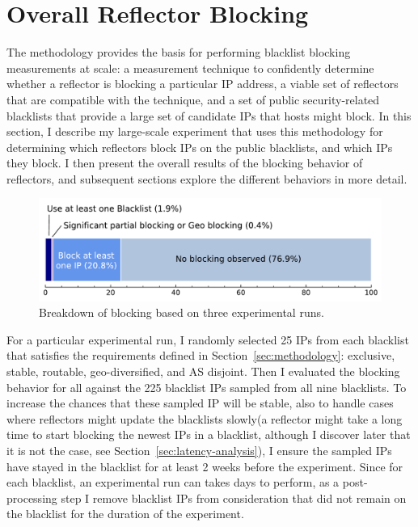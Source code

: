 \section{Overall Reflector Blocking}
\label{sec:perfect-blocking}

The methodology provides the basis for performing blacklist blocking
measurements at scale: a measurement technique to confidently
determine whether a reflector is blocking a particular IP address, a
viable set of reflectors that are compatible with the technique, and a
set of public security-related blacklists that provide a large set of
candidate IPs that hosts might block.  In this section, I describe my
large-scale experiment that uses this methodology for determining
which reflectors block IPs on the public blacklists, and which IPs
they block. I then present the overall results of the blocking
behavior of reflectors, and subsequent sections explore the different
behaviors in more detail.

\begin{figure}[t]
\centering
\includegraphics[width=0.95\columnwidth]{data_usage/images/reflector_breakdown_v2.pdf}
\caption{Breakdown of {} blocking based on three
  experimental runs.}
\label{fig:reflector-breakdown}
\end{figure}

For a particular experimental run, I randomly selected 25 IPs from
each blacklist that satisfies the requirements defined in
Section~\ref{sec:methodology}: exclusive, stable, routable,
geo-diversified, and AS disjoint. Then I evaluated the blocking
behavior for all {} {} against the 225
blacklist IPs sampled from all nine blacklists. To increase the chances
that these sampled IP will be stable, also to handle cases where reflectors
might update the blacklists slowly(a reflector might take a long time to
start blocking the newest IPs in a blacklist, although I discover
later that it is not the case, see Section~\ref{sec:latency-analysis}),
I ensure the sampled IPs have stayed in the blacklist for at least
2 weeks before the experiment. Since for each blacklist,
an experimental run can takes days to perform, as a post-processing step
I remove blacklist IPs from consideration that did not remain on the
blacklist for the duration of the experiment.

